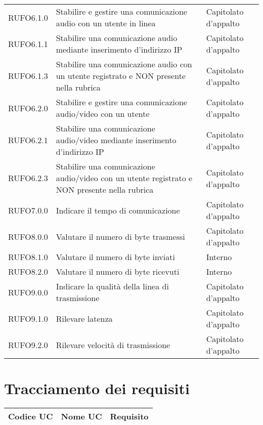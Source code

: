 \begin{longtable}{lp{}l}
RUFO6.1.0 & Stabilire e gestire una comunicazione audio con un utente in linea & Capitolato d'appalto \\
RUFO6.1.1 & Stabilire una comunicazione audio mediante inserimento d'indirizzo IP & Capitolato d'appalto \\
RUFO6.1.3 & Stabilire una comunicazione audio con un utente registrato e NON presente nella rubrica & Capitolato d'appalto \\
RUFO6.2.0 & Stabilire e gestire  una comunicazione audio/video con un utente & Capitolato d'appalto \\
RUFO6.2.1 & Stabilire una comunicazione audio/video mediante inserimento d'indirizzo IP & Capitolato d'appalto \\
RUFO6.2.3 & Stabilire una comunicazione audio/video con un utente registrato e NON presente nella rubrica & Capitolato d'appalto \\
RUFO7.0.0 & Indicare il tempo di comunicazione & Capitolato d'appalto \\
RUFO8.0.0 & Valutare il numero di byte trasmessi & Capitolato d'appalto \\
RUFO8.1.0 & Valutare il numero di byte inviati & Interno \\
RUFO8.2.0 & Valutare il numero di byte ricevuti & Interno \\
RUFO9.0.0 & Indicare la qualità della linea di trasmissione & Capitolato d'appalto \\
RUFO9.1.0 & Rilevare latenza & Capitolato d'appalto \\
RUFO9.2.0 & Rilevare velocità di trasmissione & Capitolato d'appalto \\
\bottomrule
\end{longtable}

\section{Tracciamento dei requisiti}

\begin{tabularx}{\textwidth}{lXl}
\toprule Codice UC & Nome UC  & Requisito\\
\midrule
\bottomrule
\end{tabularx}
